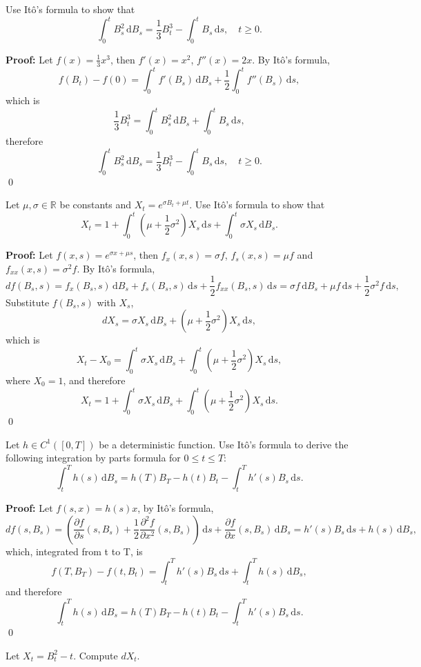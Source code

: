 \documentclass{MFM-hw} %
\date{Sep 21, 2026}
\newcommand{\dd}{\,\mathrm{d}}
\newcommand{\Ito}{It\^{o}}
\newcommand{\realset}{\mathbb{R}}
\begin{document}
\maketitle
\HWproblem
Use \Ito's formula to show that
\[
    \int_{0}^{t} B_s^2 \dd B_s = \frac{1}{3}B_t^3 - \int_0^t B_s\dd s,\quad t \ge 0.
\]

\textbf{Proof: }Let $f(x) = \frac{1}{3} x^3$, then $f'(x) = x^2$, $f''(x) = 2x$. By \Ito's formula,
\[
    f(B_t) - f(0) = \int_0^t f'(B_s)\dd B_s + \frac{1}{2}\int_0^{t} f''(B_s) \dd s,
\]
which is
\[
    \frac{1}{3} B_t^3 = \int_{0}^{t} B_s^2 \dd B_s + \int_0^t B_s\dd s,
\]
therefore
\[
    \int_{0}^{t} B_s^2 \dd B_s = \frac{1}{3}B_t^3 - \int_0^t B_s\dd s,\quad t \ge 0.
\]\qed

\HWproblem
Let $\mu,\sigma \in \realset$ be constants and $X_t = e^{\sigma B_t + \mu t}$. Use \Ito's formula to show that
\[
    X_t = 1 + \int_{0}^{t} (\mu + \frac{1}{2}\sigma^2)X_s\dd s + \int_{0}^{t} \sigma X_s \dd B_s.
\]

\textbf{Proof: }Let $f(x, s) = e^{\sigma x + \mu s}$, then $f_x(x,s) = \sigma f$, $f_s(x,s) = \mu f$ and $f_{xx}(x,s) = \sigma^2 f$. By \Ito's formula,
\[
    df(B_s, s) = f_x(B_s,s)\dd B_s + f_s(B_s, s) \dd s + \frac{1}{2} f_{xx} (B_s, s) \dd s = \sigma f\dd B_s +  \mu f \dd s +  \frac{1}{2} \sigma^2 f \dd s,
\]
Substitute $f(B_s, s)$ with $X_s$,
\[
    dX_s =  \sigma X_s \dd B_s + (\mu + \frac{1}{2} \sigma^2) X_s \dd s,
\]
which is
\[
    X_t - X_0 = \int_{0}^{t}\sigma X_s \dd B_s + \int_0^{t}(\mu + \frac{1}{2} \sigma^2) X_s \dd s,
\]
where $X_0 = 1$, and therefore
\[
    X_t = 1 + \int_{0}^{t}\sigma X_s \dd B_s + \int_0^{t}(\mu + \frac{1}{2} \sigma^2) X_s \dd s.
\]\qed

\HWproblem
Let $h \in C^1([0,T])$ be a deterministic function. Use \Ito's formula to derive the following integration by parts formula for $0 \le t \le T$:
\[
    \int_{t}^{T} h(s) \dd B_s = h(T)B_T - h(t)B_t - \int_{t}^{T} h'(s) B_s \dd s.
\]

\textbf{Proof: }Let $f(s, x) = h(s)x$, by \Ito's formula,
\[
    df(s, B_s) = \left(\frac{\partial f}{\partial s}(s,B_s)+\frac{1}{2}\frac{\partial^{2}f}{\partial x^2}(s,B_s)\right) \dd s + \frac{\partial f}{\partial x}(s,B_s) \dd B_s = h'(s) B_s \dd s + h(s) \dd B_s,
\]
which, integrated from t to T, is
\[
    f(T, B_T) - f(t,B_t) = \int_{t}^{T} h'(s)B_s \dd s + \int_t^{T}h(s) \dd B_s,
\]
and therefore
\[
    \int_{t}^{T} h(s) \dd B_s = h(T)B_T - h(t)B_t - \int_{t}^{T} h'(s) B_s \dd s.
\]\qed

\HWproblem
Let $X_t = B_t^2 - t$.
\HWsubproblem
Compute $dX_t$.
\end{document}
